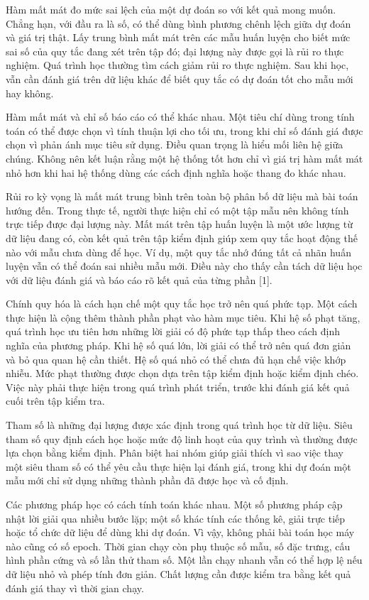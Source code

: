 Hàm mất mát đo mức sai lệch của một dự đoán so với kết quả mong muốn. Chẳng hạn, với đầu ra là số, có thể dùng bình phương chênh lệch giữa dự đoán và giá trị thật. Lấy trung bình mất mát trên các mẫu huấn luyện cho biết mức sai số của quy tắc đang xét trên tập đó; đại lượng này được gọi là rủi ro thực nghiệm. Quá trình học thường tìm cách giảm rủi ro thực nghiệm. Sau khi học, vẫn cần đánh giá trên dữ liệu khác để biết quy tắc có dự đoán tốt cho mẫu mới hay không.


Hàm mất mát và chỉ số báo cáo có thể khác nhau. Một tiêu chí dùng trong tính toán có thể được chọn vì tính thuận lợi cho tối ưu, trong khi chỉ số đánh giá được chọn vì phản ánh mục tiêu sử dụng. Điều quan trọng là hiểu mối liên hệ giữa chúng. Không nên kết luận rằng một hệ thống tốt hơn chỉ vì giá trị hàm mất mát nhỏ hơn khi hai hệ thống dùng các cách định nghĩa hoặc thang đo khác nhau.


Rủi ro kỳ vọng là mất mát trung bình trên toàn bộ phân bố dữ liệu mà bài toán hướng đến. Trong thực tế, người thực hiện chỉ có một tập mẫu nên không tính trực tiếp được đại lượng này. Mất mát trên tập huấn luyện là một ước lượng từ dữ liệu đang có, còn kết quả trên tập kiểm định giúp xem quy tắc hoạt động thế nào với mẫu chưa dùng để học. Ví dụ, một quy tắc nhớ đúng tất cả nhãn huấn luyện vẫn có thể đoán sai nhiều mẫu mới. Điều này cho thấy cần tách dữ liệu học với dữ liệu đánh giá và báo cáo rõ kết quả của từng phần [1].


Chính quy hóa là cách hạn chế một quy tắc học trở nên quá phức tạp. Một cách thực hiện là cộng thêm thành phần phạt vào hàm mục tiêu. Khi hệ số phạt tăng, quá trình học ưu tiên hơn những lời giải có độ phức tạp thấp theo cách định nghĩa của phương pháp. Khi hệ số quá lớn, lời giải có thể trở nên quá đơn giản và bỏ qua quan hệ cần thiết. Hệ số quá nhỏ có thể chưa đủ hạn chế việc khớp nhiễu. Mức phạt thường được chọn dựa trên tập kiểm định hoặc kiểm định chéo. Việc này phải thực hiện trong quá trình phát triển, trước khi đánh giá kết quả cuối trên tập kiểm tra.


Tham số là những đại lượng được xác định trong quá trình học từ dữ liệu. Siêu tham số quy định cách học hoặc mức độ linh hoạt của quy trình và thường được lựa chọn bằng kiểm định. Phân biệt hai nhóm giúp giải thích vì sao việc thay một siêu tham số có thể yêu cầu thực hiện lại đánh giá, trong khi dự đoán một mẫu mới chỉ sử dụng những thành phần đã được học và cố định.


Các phương pháp học có cách tính toán khác nhau. Một số phương pháp cập nhật lời giải qua nhiều bước lặp; một số khác tính các thống kê, giải trực tiếp hoặc tổ chức dữ liệu để dùng khi dự đoán. Vì vậy, không phải bài toán học máy nào cũng có số epoch. Thời gian chạy còn phụ thuộc số mẫu, số đặc trưng, cấu hình phần cứng và số lần thử tham số. Một lần chạy nhanh vẫn có thể hợp lệ nếu dữ liệu nhỏ và phép tính đơn giản. Chất lượng cần được kiểm tra bằng kết quả đánh giá thay vì thời gian chạy.


